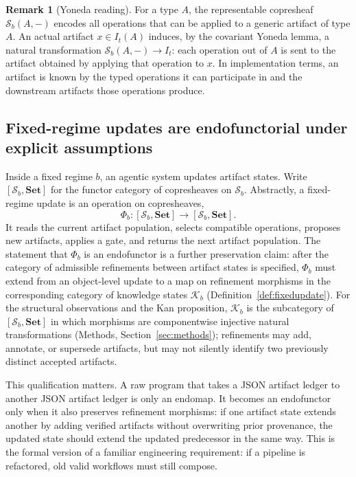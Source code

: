\documentclass[11pt]{article}
\theoremstyle{definition}
\newtheorem{remark}{Remark}
\newcommand{\K}{\mathcal{K}}
\newcommand{\Sschema}{\mathcal{S}}
\newcommand{\Set}{\mathbf{Set}}
\begin{document}
\begin{remark}[Yoneda reading]
\label{rem:yoneda}
For a type $A$, the representable copresheaf $\Sschema_b(A,-)$ encodes all operations that can be applied to a generic artifact of type $A$. An actual artifact $x\in I_t(A)$ induces, by the covariant Yoneda lemma, a natural transformation $\Sschema_b(A,-)\to I_t$: each operation out of $A$ is sent to the artifact obtained by applying that operation to $x$. In implementation terms, an artifact is known by the typed operations it can participate in and the downstream artifacts those operations produce.
\end{remark}

\subsection{Fixed-regime updates are endofunctorial under explicit assumptions}
\label{sec:endofunctor_results}

Inside a fixed regime $b$, an agentic system updates artifact states. Write $[\Sschema_b,\Set]$ for the functor category of copresheaves on $\Sschema_b$. Abstractly, a fixed-regime update is an operation on copresheaves,
\begin{equation}
\Phi_b:[\Sschema_b,\Set]\longrightarrow [\Sschema_b,\Set].
\label{eq:fixed_update}
\end{equation}
It reads the current artifact population, selects compatible operations, proposes new artifacts, applies a gate, and returns the next artifact population. The statement that $\Phi_b$ is an endofunctor is a further preservation claim: after the category of admissible refinements between artifact states is specified, $\Phi_b$ must extend from an object-level update to a map on refinement morphisms in the corresponding category of knowledge states $\K_b$ (Definition~\ref{def:fixedupdate}). For the structural observations and the Kan proposition, $\K_b$ is the subcategory of $[\Sschema_b,\Set]$ in which morphisms are componentwise injective natural transformations (Methods, Section~\ref{sec:methods}); refinements may add, annotate, or supersede artifacts, but may not silently identify two previously distinct accepted artifacts.

This qualification matters. A raw program that takes a JSON artifact ledger to another JSON artifact ledger is only an endomap. It becomes an endofunctor only when it also preserves refinement morphisms: if one artifact state extends another by adding verified artifacts without overwriting prior provenance, the updated state should extend the updated predecessor in the same way. This is the formal version of a familiar engineering requirement: if a pipeline is refactored, old valid workflows must still compose.
\end{document}
